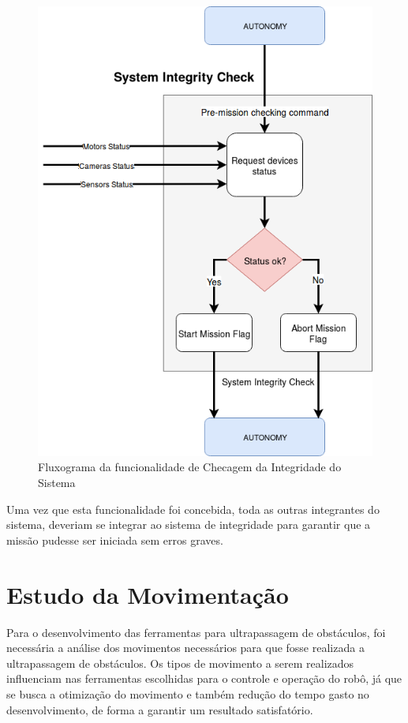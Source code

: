 \begin{figure}[H]
	\centering
	\includegraphics[scale=0.4]{Figures/sys_check_flux.png}
	\caption{Fluxograma da funcionalidade de Checagem da Integridade do Sistema}
	\label{fig:fluxo_motion}
\end{figure}
Uma vez que esta funcionalidade foi concebida, toda as outras integrantes do sistema, deveriam se integrar ao sistema de integridade para garantir que a missão pudesse ser iniciada sem erros graves.

\section{Estudo da Movimentação}\label{sec:estud_mov}
Para o desenvolvimento das ferramentas para ultrapassagem de obstáculos, foi necessária a análise dos movimentos necessários para que fosse realizada a ultrapassagem de obstáculos. Os tipos de movimento a serem realizados influenciam nas ferramentas escolhidas para o controle e operação do robô, já que se busca a otimização do movimento e também redução do tempo gasto no desenvolvimento, de forma a garantir um resultado satisfatório.

